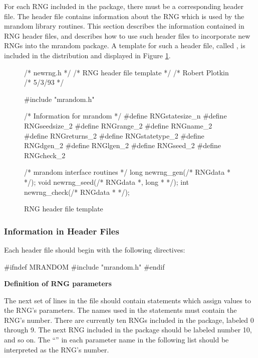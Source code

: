 For each RNG included in the package, there must be a
corresponding header file.  The header file contains information
about the RNG which is used by the mrandom library routines.
This section describes the information contained in RNG header
files, and describes how to use such header files to incorporate
new RNGs into the mrandom package.  A template for such a header file,
called , is included in the distribution and displayed in
Figure \ref{fig:newrng.h}.

\begin{figure}
\begin{example}
/* newrng.h */
/* RNG header file template */
/* Robert Plotkin
/* 5/3/93 */

#include "mrandom.h"

/* Information for mrandom */
#define RNGstatesize_n    
#define RNGseedsize_2
#define RNGrange_2
#define RNGname_2
#define RNGreturns_2
#define RNGstatetype_2
#define RNGdgen_2
#define RNGlgen_2
#define RNGseed_2
#define RNGcheck_2

/* mrandom interface routines */
long newrng_gen(/* RNGdata * */);
void newrng_seed(/* RNGdata *, long * */);
int newrng_check(/* RNGdata * */);
\end{example}
\caption{RNG header file template}
\label{fig:newrng.h}
\end{figure}

\subsubsection{Information in Header Files}
\label{sec:headers}

Each header file should begin with the following directives:\\

\begin{example}
#ifndef MRANDOM
#include "mrandom.h"
#endif\\
\end{example}

\pagebreak
\noindent
{\bf Definition of RNG parameters\\}

The next set of lines in the file should contain 
statements which assign values to the RNG's parameters.  The names used
in the  statements must contain the RNG's number.  There
are currently ten RNGs included in the package, labeled 0 through 9.
The next RNG included in the package should be labeled number 10, and so
on.  The ``'' in each parameter name in the following list
should be interpreted as the RNG's number.

